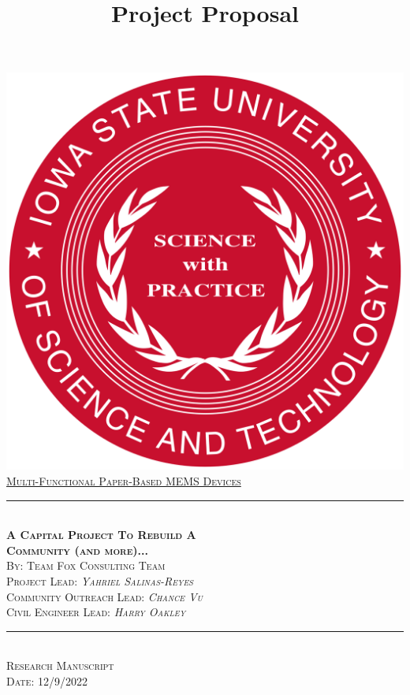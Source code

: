 \documentclass[12pt]{article}
\begin{document}
\title{Project Proposal}

\begin{titlepage}
	\centering
    \vspace*{0.2 cm}
    \includegraphics[scale = 0.15]{images/isu_seal.png}\\[1.0 cm]	%
    \textsc{\LARGE\underline{Multi-Functional Paper-Based MEMS Devices}}\\[0.4 cm]
           \rule{\linewidth}{0.4 mm} \\[0.8 cm]
	\textsc{\LARGE\textbf{A Capital Project To Rebuild A}} \\[0.2cm]
 \textsc{\LARGE\textbf{Community (and more)...}} \\[0.4 cm]
	\textsc{\Large By: Team Fox Consulting Team}\\[0.2 cm]
    \textsc{\small Project Lead: \emph{Yahriel Salinas-Reyes}}\\[0.2 cm]
    \textsc{\small Community Outreach Lead: \emph{Chance Vu}}\\[0.2 cm]
    \textsc{\small Civil Engineer Lead: \emph{Harry Oakley}}\\[0.2 cm]
\rule{\linewidth}{0.4 mm} \\[2.5 cm]
	\textsc{\LARGE Research Manuscript }\\[0.8 cm]	
    \textsc{\large Date: 12/9/2022}\\[0.8 cm]
  
	
	

	
	\vfill
	
\end{titlepage}
\end{document}
